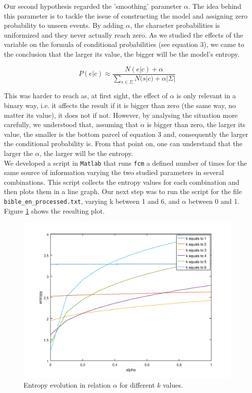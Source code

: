 \documentclass[12pt]{article}
\begin{document}
Our second hypothesis regarded the 'smoothing' parameter $\alpha$.
The idea behind this parameter is to tackle the issue of constructing the
model and assigning zero probability to unseen events.
By adding $\alpha$, the character probabilities is uniformized and they 
never actually reach zero.
As we studied the effects of the variable on the formula of conditional 
probabilities (see equation 3), we came to the conclusion that the larger
its value, the bigger will be the model's entropy.

\begin{equation}
  P(e|c) \approx \frac{N(e|c) + \alpha}{\sum\limits_{s\in\Sigma}N(s|c) + \alpha|\Sigma|}
\end{equation}

This was harder to reach as, at first sight, the effect of $\alpha$ is only 
relevant in a binary way, i.e. it affects the result if it is bigger than 
zero (the same way, no matter its value), it does not if not.
However, by analysing the situation more carefully, we understood that,
assuming that $\alpha$ is bigger than zero, the larger its value, the smaller
is the bottom parcel of equation 3 and, consequently the larger the 
conditional probability is.
From that point on, one can understand that the larger the $\alpha$, the larger
will be the entropy.\\

We developed a script in \texttt{Matlab} that runs \texttt{fcm} a
defined number of times for the same source of information varying the 
two studied parameters in several combinations.
This script collects the entropy values for each combination and then plots
them in a line graph.
Our next step was to run the script for the file 
\texttt{bible\_en\_processed.txt}, varying k between 1 and 6, and $\alpha$ 
between 0 and 1.
Figure \ref{graph} shows the resulting plot.

\begin{figure}[H]
  \centering
  \includegraphics[width=6.5in]{bible_en.png}
  \caption{Entropy evolution in relation $\alpha$ for different \(k\) values.}
  \label{graph}
\end{figure}
\end{document}
